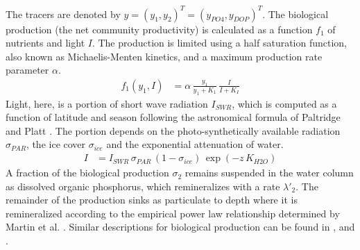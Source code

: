 \documentclass{article}
\newcommand{\lmb}{{\lambda}}
\newcommand{\sig}{\sigma}
\begin{document}
The tracers are denoted by $ y = (y_1, y_2)^T = (y_{PO4}, y_{DOP})^T$.
The biological production (the net community productivity) is calculated as a function
$f_1$ of nutrients and light $I$. The production is limited using a 
half saturation function, also known as Michaelis-Menten kinetics,
and a maximum production rate parameter $\alpha$.
%
\begin{align*}
f_1(y_1,I)	& = \alpha \, \frac{y_1}{y_1 + K_1} \, \frac{I}{I+K_I}
\end{align*}
%
Light, here, is a portion of short wave radiation $I_{SWR}$, which is computed as a
function of latitude and season following the astronomical formula of Paltridge and Platt \cite{PalPla76}.
The portion depends on the photo-synthetically available radiation $\sig_{PAR}$,
the ice cover $\sig_{ice}$ and the exponential attenuation of water.
%
\begin{align*}
I		& = I_{SWR} \, \sig_{PAR} \, (1 - \sig_{ice}) \, \exp( - z \, K_{H2O} )
\end{align*}
%
A fraction of the biological production $\sig_2$ remains suspended in the water column
as dissolved organic phosphorus, which remineralizes with a rate $\lmb'_2$.
The remainder of the production sinks as particulate to depth where it is
remineralized according to the empirical power law relationship determined by
Martin et al. \cite{MaKnKaBr87}. Similar descriptions for biological production can be
found in \cite{PaFoBo05}, \cite{DuFoPa05} and \cite{YamTaj97}.
\end{document}
